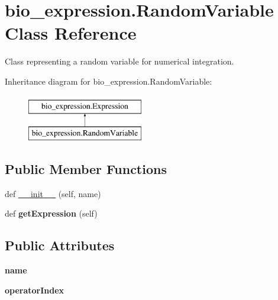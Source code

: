 \hypertarget{classbio__expression_1_1_random_variable}{}\section{bio\+\_\+expression.\+Random\+Variable Class Reference}
\label{classbio__expression_1_1_random_variable}


Class representing a random variable for numerical integration.  


Inheritance diagram for bio\+\_\+expression.\+Random\+Variable\+:\begin{figure}[H]
\begin{center}
\leavevmode
\includegraphics[height=2.000000cm]{classbio__expression_1_1_random_variable}
\end{center}
\end{figure}
\subsection*{Public Member Functions}
\begin{DoxyCompactItemize}
\item 
def \hyperlink{classbio__expression_1_1_random_variable_a497a7c40e147f84266f0677814133ada}{\+\_\+\+\_\+init\+\_\+\+\_\+} (self, name)
\item 
def {\bfseries get\+Expression} (self)\hypertarget{classbio__expression_1_1_random_variable_a656c1d3333aea7f077985762278d8ba8}{}\label{classbio__expression_1_1_random_variable_a656c1d3333aea7f077985762278d8ba8}

\end{DoxyCompactItemize}
\subsection*{Public Attributes}
\begin{DoxyCompactItemize}
\item 
{\bfseries name}\hypertarget{classbio__expression_1_1_random_variable_adb0d67ebbf26c734c2675db7243b7e50}{}\label{classbio__expression_1_1_random_variable_adb0d67ebbf26c734c2675db7243b7e50}

\item 
{\bfseries operator\+Index}\hypertarget{classbio__expression_1_1_random_variable_aa36861c700b320e1c2557eea1e8011c3}{}\label{classbio__expression_1_1_random_variable_aa36861c700b320e1c2557eea1e8011c3}

\end{DoxyCompactItemize}


